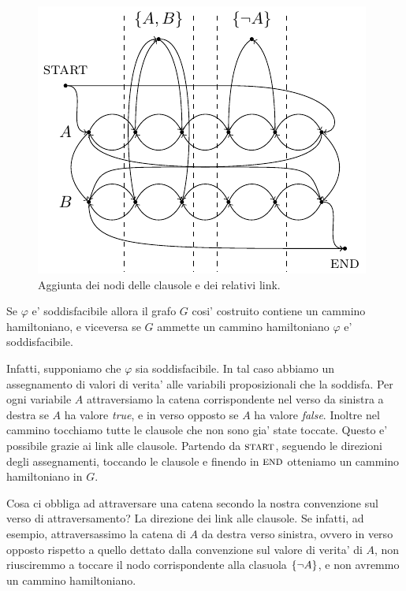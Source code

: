 \begin{figure}[h]
    \begin{center}
        \includegraphics{./img/NPClass/SATdHAM3.pdf}
        \caption{Aggiunta dei nodi delle clausole e dei relativi link.}
    \end{center}
\end{figure}

Se $\varphi$ e' soddisfacibile allora il grafo $G$ cosi' costruito contiene un cammino hamiltoniano,
e viceversa se $G$ ammette un cammino hamiltoniano $\varphi$ e' soddisfacibile.

Infatti, supponiamo che $\varphi$ sia soddisfacibile. In tal caso abbiamo un assegnamento di valori
di verita' alle variabili proposizionali che la soddisfa. Per ogni variabile $A$ attraversiamo la
catena corrispondente nel verso da sinistra a destra se $A$ ha valore \textit{true}, e in verso
opposto se $A$ ha valore \textit{false}. Inoltre nel cammino tocchiamo tutte le clausole che non
sono gia' state toccate.  Questo e' possibile grazie ai link alle clausole. Partendo da
$\textsc{start}$, seguendo le direzioni degli assegnamenti, toccando le clausole e finendo in
$\textsc{end}$ otteniamo un cammino hamiltoniano in $G$.

Cosa ci obbliga ad attraversare una catena secondo la nostra convenzione sul verso di
attraversamento? La direzione dei link alle clausole. Se infatti, ad esempio, attraversassimo la
catena di $A$ da destra verso sinistra, ovvero in verso opposto rispetto a quello dettato dalla
convenzione sul valore di verita' di $A$, non riusciremmo a toccare il nodo corrispondente alla
clasuola $\left\{\lnot A\right\}$, e non avremmo un cammino hamiltoniano.

